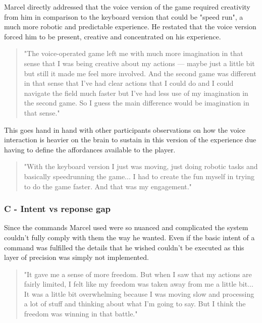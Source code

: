 Marcel directly addressed that the voice version of the game required creativity from him in comparison to the keyboard version that could be "speed run", a much more robotic and predictable experience. He restated that the voice version forced him to be present, creative and concentrated on his experience. 

\begin{quote}
    "The voice-operated game left me with much more imagination in that sense that I was being creative about my actions — maybe just a little bit but still it made me feel more involved. And the second game was different in that sense that I've had clear actions that I could do and I could navigate the field much faster but I've had less use of my imagination in the second game. So I guess the main difference would be imagination in that sense."
\end{quote}

This goes hand in hand with other participants observations on how the voice interaction is heavier on the brain to sustain in this version of the experience due having to define the affordances available to the player. 

\begin{quote}
    "With the keyboard version I just was moving, just doing robotic tasks and basically speedrunning the game... I had to create the fun myself in trying to do the game faster. And that was my engagement."
\end{quote}


\subsubsection{C - Intent vs reponse gap}


Since the commands Marcel used were so nuanced and complicated the system couldn't fully comply with them the way he wanted. Even if the basic intent of a command was fulfilled the details that he wished couldn't be executed as this layer of precision was simply not implemented.

\begin{quote}
    "It gave me a sense of more freedom. But when I saw that my actions are fairly limited, I felt like my freedom was taken away from me a little bit... It was a little bit overwhelming because I was moving slow and processing a lot of stuff and thinking about what I'm going to say. But I think the freedom was winning in that battle."
\end{quote}

